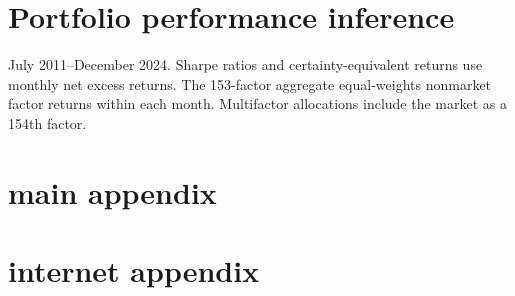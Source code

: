 \documentclass[11pt]{article}
\begin{document}
\section*{Portfolio performance inference}
July 2011--December 2024. Sharpe ratios and certainty-equivalent returns use monthly net excess returns. The 153-factor aggregate equal-weights nonmarket factor returns within each month. Multifactor allocations include the market as a 154th factor.
\clearpage
\section*{main appendix}


\clearpage
\section*{internet appendix}




\end{document}
